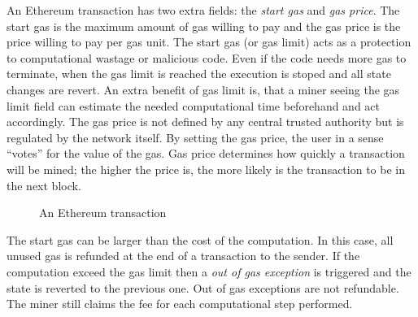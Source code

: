 An Ethereum transaction has two extra fields: the \textit{start gas} and \textit{gas price}. The start gas is the maximum amount of gas willing to pay and the gas price is the price willing to pay per gas unit. The start gas (or gas limit) acts as a protection to computational wastage or malicious code. Even if the code needs more gas to terminate, when the gas limit is reached the execution is stoped and all state changes are revert. An extra benefit of gas limit is, that a miner seeing the gas limit field can estimate the needed computational time beforehand and act accordingly. The gas price is not defined by any central trusted authority but is regulated by the network itself. By setting the gas price, the user in a sense ``votes'' for the value of the gas. Gas price determines how quickly a transaction will be mined; the higher the price is, the more likely is the transaction to be in the next block.

\begin{figure}[!ht]
  \centering
  \caption{An Ethereum transaction}
  \label{fig:eth_transaction}
\end{figure}

The start gas can be larger than the cost of the computation. In this case, all unused gas is refunded at the end of a transaction to the sender. If the computation exceed the gas limit then a \textit{out of gas exception} is triggered and the state is reverted to the previous one. Out of gas exceptions are not refundable. The miner still claims the fee for each computational step performed.

